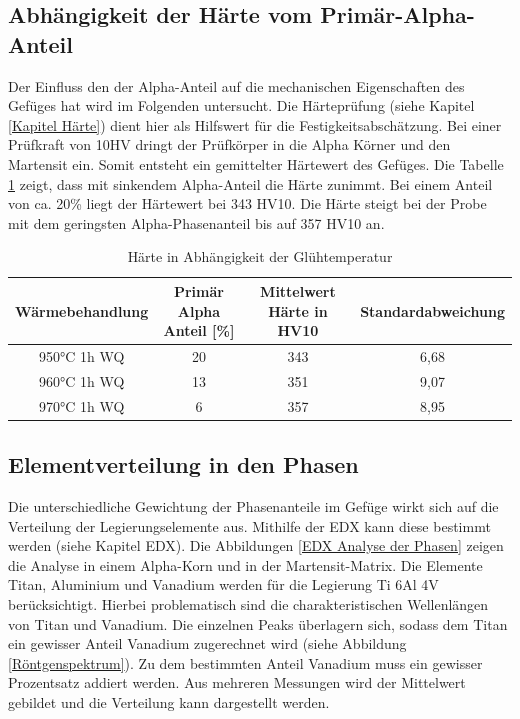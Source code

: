 \documentclass[a4paper, 11pt]{tubsreprt}
\begin{document}
\subsection{Abhängigkeit der Härte vom Primär-Alpha-Anteil} \label{Kapitel Abhängigkeit der Härte vom Primäralphaanteil}
Der Einfluss den der Alpha-Anteil auf die mechanischen Eigenschaften des Gefüges hat wird im Folgenden untersucht. Die Härteprüfung (siehe Kapitel \ref{Kapitel Härte}) dient hier als Hilfswert für die Festigkeitsabschätzung. Bei einer Prüfkraft von 10HV dringt der Prüfkörper in die Alpha Körner und den Martensit ein. Somit entsteht ein gemittelter Härtewert des Gefüges. Die Tabelle \ref{Härte in Abhängigkeit der Glühtemperatur} zeigt, dass mit sinkendem Alpha-Anteil die Härte zunimmt. Bei einem Anteil von ca. 20\% liegt der Härtewert bei 343 HV10. Die Härte steigt bei der Probe mit dem geringsten Alpha-Phasenanteil bis auf 357 HV10 an.

\begin{table}	%
\begin{tabular}{c|c|c|c}
Wärmebehandlung	& Primär Alpha Anteil [\%] &	Mittelwert 
Härte in HV10 	& Standardabweichung \\
\hline
950°C 1h WQ	& 	20	&	343	&	6,68 \\
960°C 1h WQ	&	13	&	351	&	9,07 \\
970°C 1h WQ	&	6	&	357	&	8,95 \\

\end{tabular}
\caption{Härte in Abhängigkeit der Glühtemperatur}
\label{Härte in Abhängigkeit der Glühtemperatur}
\end{table}

\subsection{Elementverteilung in den Phasen}
Die unterschiedliche Gewichtung der Phasenanteile im Gefüge wirkt sich auf die Verteilung der Legierungselemente aus. Mithilfe der EDX kann diese bestimmt werden (siehe Kapitel EDX). Die Abbildungen \ref{EDX Analyse der Phasen} zeigen die Analyse in einem Alpha-Korn und in der Martensit-Matrix. Die Elemente Titan, Aluminium und Vanadium werden für die Legierung Ti 6Al 4V berücksichtigt. Hierbei problematisch sind die charakteristischen Wellenlängen von Titan und Vanadium. Die einzelnen Peaks überlagern sich, sodass dem Titan ein gewisser Anteil Vanadium zugerechnet wird (siehe Abbildung \ref{Röntgenspektrum}). Zu dem bestimmten Anteil Vanadium muss ein gewisser Prozentsatz addiert werden. Aus mehreren Messungen wird der Mittelwert gebildet und die Verteilung kann dargestellt werden.
\end{document}
